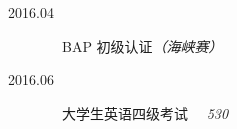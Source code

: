 \begin{tcolorbox}[colback=yellow!58!red,colframe=orange!75!black]
    \begin{description}
        \item [2016.04] ~~BAP 初级认证\emph{（海峡赛）} 
        \item [2016.06] ~~大学生英语四级考试 ~~\emph{530}
    \end{description}
\end{tcolorbox}